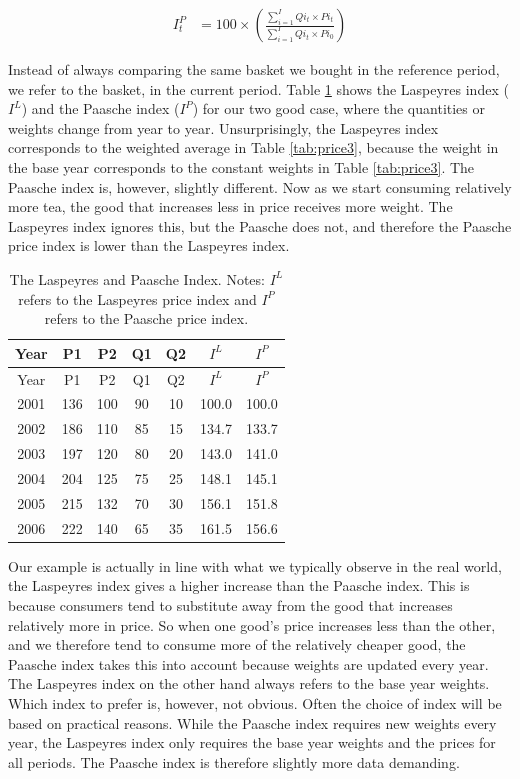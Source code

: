 \documentclass[
]{book}
\begin{document}
\begin{align}
   I_t^P&=100\times \left(\frac{\sum^I_{i=1} Qi_t \times Pi_t}{\sum^I_{i=1}Qi_t \times Pi_0}\right)
    \label{eq10}
\end{align}

Instead of always comparing the same basket we bought in the reference period, we refer to the basket, in the current period. Table \ref{tab:price4} shows the Laspeyres index (\(I^L\)) and the Paasche index (\(I^P\)) for our two good case, where the quantities or weights change from year to year. Unsurprisingly, the Laspeyres index corresponds to the weighted average in Table \ref{tab:price3}, because the weight in the base year corresponds to the constant weights in Table \ref{tab:price3}. The Paasche index is, however, slightly different. Now as we start consuming relatively more tea, the good that increases less in price receives more weight. The Laspeyres index ignores this, but the Paasche does not, and therefore the Paasche price index is lower than the Laspeyres index.

\begin{longtable}[]{@{}ccccccc@{}}
\caption{\label{tab:price4} The Laspeyres and Paasche Index. Notes: \(I^L\) refers to the Laspeyres price index and \(I^P\) refers to the Paasche price index.}\tabularnewline
\toprule
Year & P1 & P2 & Q1 & Q2 & \(I^L\) & \(I^P\) \\
\midrule
\endfirsthead
\toprule
Year & P1 & P2 & Q1 & Q2 & \(I^L\) & \(I^P\) \\
\midrule
\endhead
2001 & 136 & 100 & 90 & 10 & 100.0 & 100.0 \\
2002 & 186 & 110 & 85 & 15 & 134.7 & 133.7 \\
2003 & 197 & 120 & 80 & 20 & 143.0 & 141.0 \\
2004 & 204 & 125 & 75 & 25 & 148.1 & 145.1 \\
2005 & 215 & 132 & 70 & 30 & 156.1 & 151.8 \\
2006 & 222 & 140 & 65 & 35 & 161.5 & 156.6 \\
\bottomrule
\end{longtable}

Our example is actually in line with what we typically observe in the real world, the Laspeyres index gives a higher increase than the Paasche index. This is because consumers tend to substitute away from the good that increases relatively more in price. So when one good's price increases less than the other, and we therefore tend to consume more of the relatively cheaper good, the Paasche index takes this into account because weights are updated every year. The Laspeyres index on the other hand always refers to the base year weights. Which index to prefer is, however, not obvious. Often the choice of index will be based on practical reasons. While the Paasche index requires new weights every year, the Laspeyres index only requires the base year weights and the prices for all periods. The Paasche index is therefore slightly more data demanding.
\end{document}
